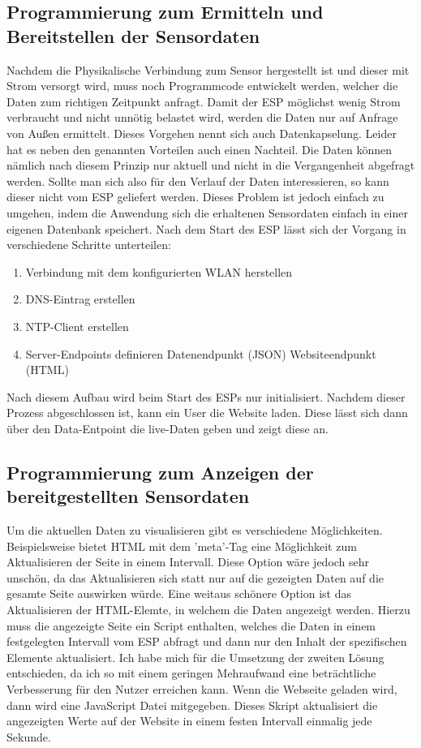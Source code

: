\subsection{Programmierung zum Ermitteln und Bereitstellen der Sensordaten}
Nachdem die Physikalische Verbindung zum Sensor hergestellt ist und dieser mit Strom versorgt wird, muss noch Programmcode entwickelt werden, welcher die Daten zum richtigen Zeitpunkt anfragt. Damit der ESP möglichst wenig Strom verbraucht und nicht unnötig belastet wird, werden die Daten nur auf Anfrage von Außen ermittelt. Dieses Vorgehen nennt sich auch Datenkapselung. Leider hat es neben den genannten Vorteilen auch einen Nachteil. Die Daten können nämlich nach diesem Prinzip nur aktuell und nicht in die Vergangenheit abgefragt werden. Sollte man sich also für den Verlauf der Daten interessieren, so kann dieser nicht vom ESP geliefert werden. Dieses Problem ist jedoch einfach zu umgehen, indem die Anwendung sich die erhaltenen Sensordaten einfach in einer eigenen Datenbank speichert. Nach dem Start des ESP lässt sich der Vorgang in verschiedene Schritte unterteilen:
\begin{enumerate}
    \item Verbindung mit dem konfigurierten WLAN herstellen
    \item DNS-Eintrag erstellen
    \item NTP-Client erstellen
    \item Server-Endpoints definieren
    \subitem Datenendpunkt (JSON)
    \subitem Websiteendpunkt (HTML)
\end{enumerate}
Nach diesem Aufbau wird beim Start des ESPs nur initialisiert. Nachdem dieser Prozess abgeschlossen ist, kann ein User die Website laden. Diese lässt sich dann über den Data-Entpoint die live-Daten geben und zeigt diese an.
\subsection{Programmierung zum Anzeigen der bereitgestellten Sensordaten}
Um die aktuellen Daten zu visualisieren gibt es verschiedene Möglichkeiten. Beispielsweise bietet \ac{HTML} mit dem 'meta'-Tag eine Möglichkeit zum Aktualisieren der Seite in einem Intervall. Diese Option wäre jedoch sehr unschön, da das Aktualisieren sich statt nur auf die gezeigten Daten auf die gesamte Seite auswirken würde. Eine weitaus schönere Option ist das Aktualisieren der \ac{HTML}-Elemte, in welchem die Daten angezeigt werden. Hierzu muss die angezeigte Seite ein Script enthalten, welches die Daten in einem festgelegten Intervall vom ESP abfragt und dann nur den Inhalt der spezifischen Elemente aktualisiert.
Ich habe mich für die Umsetzung der zweiten Lösung entschieden, da ich so mit einem geringen Mehraufwand eine beträchtliche Verbesserung für den Nutzer erreichen kann. Wenn die Webseite geladen wird, dann wird eine JavaScript Datei mitgegeben. Dieses Skript aktualisiert die angezeigten Werte auf der Website in einem festen Intervall einmalig jede Sekunde.